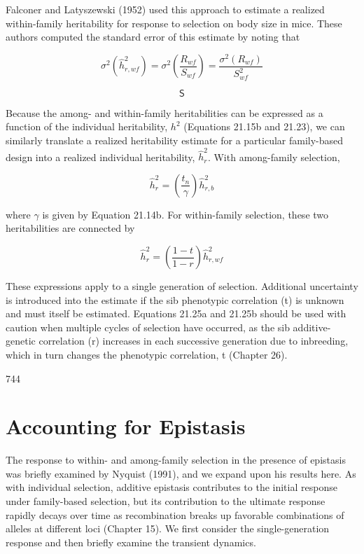 \documentclass{article}
\begin{document}
Falconer and Latyszewski (1952) used this approach to estimate a realized within-family heritability for response to selection on body size in mice. These authors computed the standard error of this estimate by noting that

\begin{equation}
\sigma^{2}\left(\widehat{h}_{r,w f}^{2}\right)=\sigma^{2}\left(\frac{R_{w f}}{S_{w f}}\right)=\frac{\sigma^{2}\left(R_{w f}\right)}{S_{w f}^{2}}
\tag{21.24b}
\label{eq:21_24b}
\end{equation}

\begin{equation}
\mathsf{S}
\end{equation}

Because the among- and within-family heritabilities can be expressed as a function of the individual heritability,  $ h^2 $ (Equations 21.15b and 21.23), we can similarly translate a realized heritability estimate for a particular family-based design into a realized individual heritability,  $ \widehat{h}_r^2 $. With among-family selection,

\begin{equation}
\widehat{h}_{r}^{2}=\left(\frac{t_{n}}{\gamma}\right)\widehat{h}_{r,b}^{2}
\tag{21.25a}
\label{eq:21_25a}
\end{equation}

where  $ \gamma $ is given by Equation 21.14b. For within-family selection, these two heritabilities are connected by

\begin{equation}
\widehat{h}_{r}^{2}=\left(\frac{1-t}{1-r}\right)\widehat{h}_{r,w f}^{2}
\tag{21.25b}
\label{eq:21_25b}
\end{equation}

These expressions apply to a single generation of selection. Additional uncertainty is introduced into the estimate if the sib phenotypic correlation (t) is unknown and must itself be estimated. Equations 21.25a and 21.25b should be used with caution when multiple cycles of selection have occurred, as the sib additive-genetic correlation (r) increases in each successive generation due to inbreeding, which in turn changes the phenotypic correlation, t (Chapter 26).

744

\section{Accounting for Epistasis}
The response to within- and among-family selection in the presence of epistasis was briefly examined by Nyquist (1991), and we expand upon his results here. As with individual selection, additive epistasis contributes to the initial response under family-based selection, but its contribution to the ultimate response rapidly decays over time as recombination breaks up favorable combinations of alleles at different loci (Chapter 15). We first consider the single-generation response and then briefly examine the transient dynamics.
\end{document}
